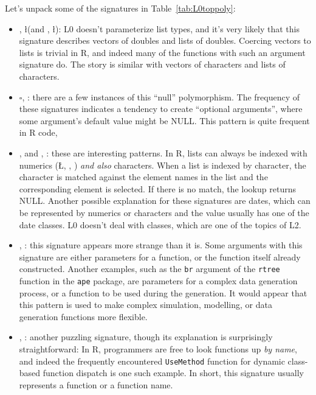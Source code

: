 \documentclass[acmsmall,10pt,review,anonymous]{acmart}\settopmatter{printfolios=true,printccs=false,printacmref=false}
\begin{document}
Let's unpack some of the signatures in Table~\ref{tab:L0toppoly}:

\begin{itemize}

	\item \D, \l (and \C, \l): L0 doesn't parameterize list types, and it's very likely that this signature describes vectors of doubles and lists of doubles.
	Coercing vectors to lists is trivial in R, and indeed many of the functions with such an argument signature do.
	The story is similar with vectors of characters and lists of characters.
	
	\item $\square$, \sN: there are a few instances of this ``null'' polymorphism.
	The frequency of these signatures indicates a tendency to create ``optional arguments'', where some argument's default value might be NULL.
	This pattern is quite frequent in R code, 

	\item \C, \D and \C, \I: these are interesting patterns.
	In R, lists can always be indexed with numerics (\L, \D, \I) {\it and also} characters.
	When a list is indexed by character, the character is matched against the element names in the list and the corresponding element is selected.
	If there is no match, the lookup returns NULL.
	Another possible explanation for these signatures are dates, which can be represented by numerics or characters and the value usually has one of the date classes.
	L0 doesn't deal with classes, which are one of the topics of L2.

	\item \D, \sF: this signature appears more strange than it is.
	Some arguments with this signature are either parameters for a function, or the function itself already constructed.
	Another examples, such as the {\tt br} argument of the {\tt rtree} function in the {\tt ape} package, are parameters for a complex data generation process, or a function to be used during the generation.
	It would appear that this pattern is used to make complex simulation, modelling, or data generation functions more flexible.
	
	\item \C, \sF: another puzzling signature, though its explanation is surprisingly straightforward:
	In R, programmers are free to look functions up {\it by name}, and indeed the frequently encountered {\tt UseMethod} function for dynamic class-based function dispatch is one such example.
	In short, this signature usually represents a function or a function name.

\end{itemize}
\end{document}
